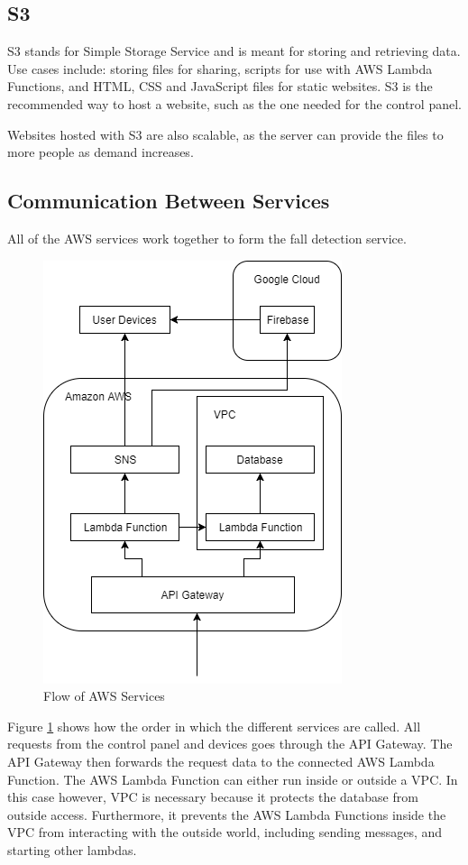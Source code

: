 \subsection{S3} \label{s3}
S3 stands for Simple Storage Service and is meant for storing and retrieving data. Use cases include: storing files for sharing, scripts for use with AWS Lambda Functions, and HTML, CSS and JavaScript files for static websites. S3 is the recommended way to host a website, such as the one needed for the control panel. %

Websites hosted with S3 are also scalable, as the server can provide the files to more people as demand increases.

\subsection{Communication Between Services}
All of the AWS services work together to form the fall detection service.

\begin{figure}[H]
    \centering
    \includegraphics{Figures/aws_diagram.png}
    \caption{Flow of AWS Services}
    \label{fig:aws_diagram}
\end{figure}

Figure \ref{fig:aws_diagram} shows how the order in which the different services are called. All requests from the control panel and devices goes through the API Gateway. The API Gateway then forwards the request data to the connected AWS Lambda Function. The AWS Lambda Function can either run inside or outside a VPC. In this case however, VPC is necessary because it protects the database from outside access. Furthermore, it prevents the AWS Lambda Functions inside the VPC from interacting with the outside world, including sending messages, and starting other lambdas.

